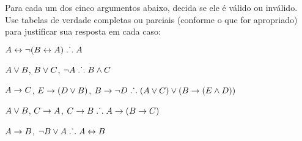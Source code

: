 \noindent\problempart Para cada um dos cinco argumentos abaixo, decida se ele é válido ou inválido.
Use tabelas de verdade completas ou parciais (conforme o que for apropriado) para justificar sua resposta em cada caso:
\label{pr.TT.valid6} 
\begin{earg}
\item $A\leftrightarrow\neg(B\leftrightarrow A)\mathrel{\ldotp\dot{}\,\ldotp} A$ %
\item $A\vee B$, $B\vee C$, $\neg A\mathrel{\ldotp\dot{}\,\ldotp} B \wedge C$ %
\item $A \rightarrow C$, $E \rightarrow (D \vee B)$, $B \rightarrow \neg D\mathrel{\ldotp\dot{}\,\ldotp} (A \vee C) \vee (B \rightarrow (E \wedge D))$ %
\item $A \vee B$, $C \rightarrow A$, $C \rightarrow B\mathrel{\ldotp\dot{}\,\ldotp} A \rightarrow (B \rightarrow C)$ %
\item $A \rightarrow B$, $\neg B \vee A\mathrel{\ldotp\dot{}\,\ldotp} A \leftrightarrow B$ %
\end{earg}

